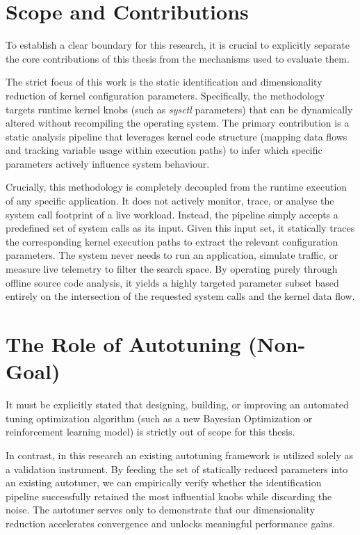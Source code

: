 \section{Scope and Contributions}\label{sec:problem-scope}

To establish a clear boundary for this research, it is crucial to explicitly separate the core contributions of this thesis from the mechanisms used to evaluate them.

The strict focus of this work is the static identification and dimensionality reduction of kernel configuration parameters.
Specifically, the methodology targets runtime kernel knobs (such as \textit{sysctl} parameters) that can be dynamically altered without recompiling the operating system.
The primary contribution is a static analysis pipeline that leverages kernel code structure (mapping data flows and tracking variable usage within execution paths) to infer which specific parameters actively influence system behaviour.

Crucially, this methodology is completely decoupled from the runtime execution of any specific application.
It does not actively monitor, trace, or analyse the system call footprint of a live workload.
Instead, the pipeline simply accepts a predefined set of system calls as its input.
Given this input set, it statically traces the corresponding kernel execution paths to extract the relevant configuration parameters.
The system never needs to run an application, simulate traffic, or measure live telemetry to filter the search space.
By operating purely through offline source code analysis, it yields a highly targeted parameter subset based entirely on the intersection of the requested system calls and the kernel data flow.

\section{The Role of Autotuning (Non-Goal)}

It must be explicitly stated that designing, building, or improving an automated tuning optimization algorithm (such as a new Bayesian Optimization or reinforcement learning model) is strictly out of scope for this thesis.

In contrast, in this research an existing autotuning framework is utilized solely as a validation instrument.
By feeding the set of statically reduced parameters into an existing autotuner, we can empirically verify whether the identification pipeline successfully retained the most influential knobs while discarding the noise.
The autotuner serves only to demonstrate that our dimensionality reduction accelerates convergence and unlocks meaningful performance gains.

